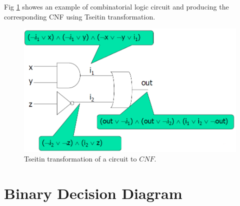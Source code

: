 \documentclass[12pt]{book}
\begin{document}
\begin{examp}\label{exp:tseitin2}
      Fig \ref{fig:tss2} showes an example of  combinatorial logic circuit and producing the corresponding CNF using Tseitin transformation.
	  \begin{figure}
      \begin{center}
      \includegraphics[scale =0.5]{tseitin1.png}
      \caption{Tseitin transformation of a circuit to $CNF$.}
	  \label{fig:tss2}
      \end{center}
      \end{figure}
\end{examp}
\section{Binary Decision Diagram}
\label{sec:Binary Decision Diagram}
\end{document}
